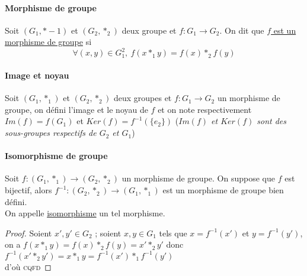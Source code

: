 		\paragraph{Morphisme de groupe}
			Soit $(G_1,*-1)$ et $(G_2,*_2)$ deux groupe et $f: G_1 \rightarrow G_2$. On dit que \underline{$f$ est un morphisme de groupe} si 
			\[\forall (x,y) \in G_1^2 ,~f(x *_1 y) = f(x) *_2 f(y) \] \vspace*{-0.7cm} \trait
		 \traitd
		\paragraph{Image et noyau}
			Soit $(G_1,*_1)$ et $(G_2,*_2)$ deux groupes et $f: G_1 \rightarrow G_2$ un morphisme de groupe, on défini l'image et le noyau de $f$ 
			et on note respectivement $Im(f)=f(G_1)$ et $Ker(f)=f^{-1} (\{e_2\})$ \hspace*{0.5cm}(\textit{\small $Im(f)$ et $Ker(f)$ sont des 
			sous-groupes respectifs de $G_2$ et $G_1$})\trait
		 \\ \traitd
		\paragraph{Isomorphisme de groupe} 
			Soit $f:(G_1,*_1)\rightarrow (G_2,*_2)$ un morphisme de groupe. On suppose que $f$ est bijectif, alors $f^{-1} : (G_2,*_2)\rightarrow 
			(G_1,*_1)$ est un morphisme de groupe bien défini.\\ On appelle \underline{isomorphisme} un tel morphisme. \trait \vspace*{-1.3cm}
		\begin{proof}
		Soient $x',y' \in G_2$ ; soient $x,y\in G_1$ tels que $x=f^{-1}(x')$ et $y=f^{-1}(y')$, \\ on a $f(x*_1 y) = f(x)*_2f(y) = x' *_2 y'$ donc 
		$f^{-1}(x' *_2 y') = x *_1 y = f^{-1}(x') *_1 f^{-1}(y')$ \\ d'où \textsc{cqfd}
		\end{proof}
